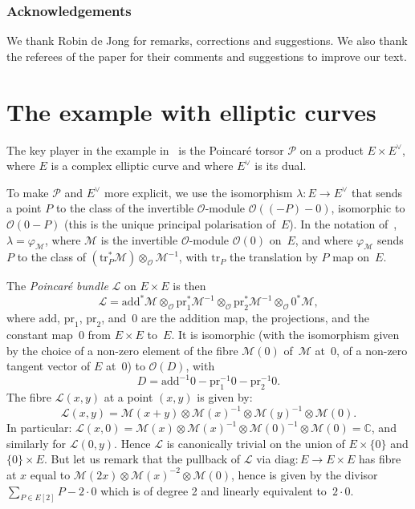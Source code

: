 \documentclass[JEP,XML,SOM,Unicode,NoFloatCountersInSection]{cedram}
\let\mathcal\mathscr
\let\oldvee\vee
\renewcommand{\vee}{{\scriptscriptstyle\oldvee}}
\theoremstyle{plain}
\theoremstyle{definition}
\numberwithin{equation}{subsection}
\let\phi\varphi
\renewcommand{\C}{\mathbb C}
\newcommand{\calL}{\mathcal{L}}
\newcommand{\calM}{\mathcal{M}}
\newcommand{\calO}{\mathcal{O}}
\newcommand{\calP}{\mathcal{P}}
\newcommand{\add}{\mathrm{add}}
\newcommand{\diag}{\mathrm{diag}}
\newcommand{\pr}{\mathrm{pr}}
\newcommand{\transl}{\mathrm{tr}}
\begin{document}
\subsubsection*{Acknowledgements}
We thank Robin de Jong for remarks, corrections and suggestions. We
also thank the referees of the paper for their comments and
suggestions to improve our text.

\section{The example with elliptic curves}\label{sec2}
The key player in the example in~\cite{Bertrand11} is the Poincaré
torsor $\calP$ on a product $E\times E^\vee$, where $E$ is a complex
elliptic curve and where $E^\vee$ is its dual.

To make $\calP$ and $E^\vee$ more explicit, we use the isomorphism
$\lambda\colon E \to E^\vee$ that sends a point $P$ to the class of
the invertible $\calO$-module $\calO((-P)-0)$, isomorphic to
$\calO(0-P)$ (this is the unique principal polarisation of~$E$). In
the notation of~\cite[\S 6]{MumfordAV}, $\lambda=\phi_\calM$,
where $\calM$ is the invertible $\calO$-module $\calO(0)$ on~$E$, and
where $\phi_\calM$ sends $P$ to the class of
$(\transl_P^*\calM)\otimes_\calO\calM^{-1}$, with $\transl_P$ the
translation by $P$ map on~$E$.

The \emph{Poincaré bundle} $\calL$ on $E\times E$ is then
\begin{equation}\label{eqn:defPbundle}
\calL =
\add^*\calM\otimes_\calO\pr_1^*\calM^{-1}\otimes_\calO\pr_2^*\calM^{-1}\otimes_\calO0^*\calM,
\end{equation}
where $\add$, $\pr_1$, $\pr_2$, and~$0$ are the addition map, the
projections, and the constant map~$0$ from $E\times E$ to~$E$. It is
isomorphic (with the isomorphism given by the choice of a non-zero
element of the fibre $\calM(0)$ of~$\calM$ at~$0$, \ie of a non-zero
tangent vector of $E$ at~$0$) to $\calO(D)$, with
\begin{equation}\label{eqn:defD}
D=\add^{-1}0-\pr_1^{-1}0-\pr_2^{-1}0.
\end{equation}
The fibre $\calL(x,y)$ at a point $(x,y)$ is given by:
\begin{equation}\label{eqn:fibresPbundle}
\calL(x,y) =
\calM(x+y)\otimes\calM(x)^{-1}\otimes\calM(y)^{-1}\otimes\calM(0).
\end{equation}
In particular:
$\calL(x,0)=\calM(x)\otimes\calM(x)^{-1}\otimes\calM(0)^{-1}\otimes\calM(0)=\C$,
and similarly for $\calL(0,y)$. Hence $\calL$ is canonically trivial on the union of
$E\times\{0\}$ and $\{0\}\times E$. But let us remark that the
pullback of $\calL$ via $\diag\colon E\to E\times E$ has fibre at $x$
equal to $\calM(2x)\otimes\calM(x)^{-2}\otimes\calM(0)$, hence is
given by the divisor $\sum_{P\in E[2]}P - 2{\cdot}0$ which is of degree
2 and linearly equivalent to~$2{\cdot}0$.
\end{document}
